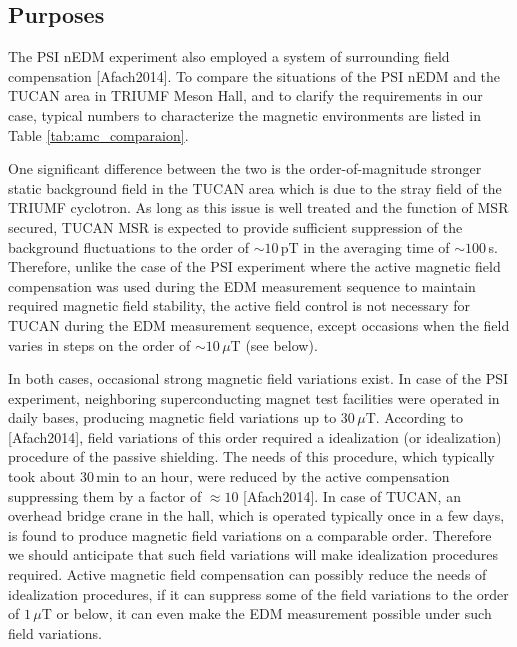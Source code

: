 



\subsection{Purposes}

The PSI nEDM experiment also employed a system of surrounding field compensation [Afach2014]. To compare the situations of the PSI nEDM and the TUCAN area in  TRIUMF Meson Hall, and to clarify the requirements in our case, typical numbers to characterize the magnetic environments are listed  in Table \ref{tab:amc_comparaion}. 

One significant difference between the two is the order-of-magnitude stronger static background field in the TUCAN area which is due to the stray field of the TRIUMF cyclotron. As long as this issue is well treated and the function of MSR secured, TUCAN MSR is expected to provide sufficient suppression of the background fluctuations to the order of $\sim10\,$pT in the averaging time of $\sim 100\,$s. 
Therefore, unlike the case of the PSI experiment where the active magnetic field compensation was used during the EDM measurement sequence to maintain required magnetic field stability, the active field control is not necessary for TUCAN during the EDM measurement sequence, except occasions when the field varies in steps on the order of $\sim 10\,\mu$T (see below).

In both cases, occasional strong magnetic field variations exist. In case of the PSI experiment, neighboring superconducting magnet test facilities were operated in daily bases,  producing magnetic field variations up to $30\,\mu$T. According to [Afach2014],  field variations of this order required a idealization (or idealization) procedure of the passive shielding. The needs of this procedure, which typically took about 30\,min to an hour, were reduced by the active compensation suppressing them by a factor of $\approx10$ [Afach2014]. In case of TUCAN, an overhead bridge crane in the hall, which is operated typically once in a few days, is found to produce magnetic field variations on a comparable order. Therefore we should anticipate that such field variations will make idealization procedures required. Active magnetic field compensation can possibly reduce the needs of idealization procedures, if it can suppress some of the field variations to the order of $1\,\mu$T or below, it can even make the EDM measurement possible under such field variations.

